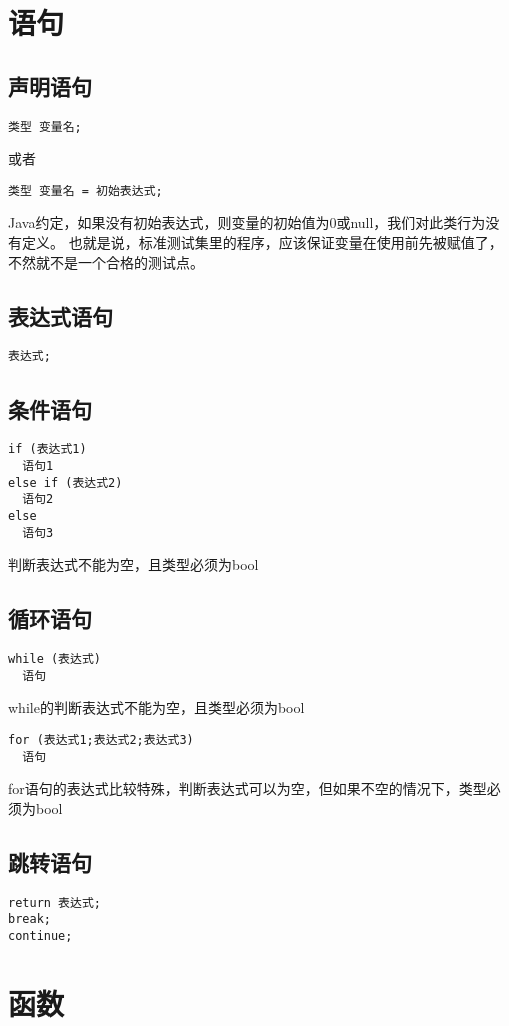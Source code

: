 \documentclass[twocolumn]{article}
\begin{document}
\section{语句}
\subsection{声明语句}
\begin{verbatim}
类型 变量名;
\end{verbatim}
或者
\begin{verbatim}
类型 变量名 = 初始表达式;
\end{verbatim}
Java约定，如果没有初始表达式，则变量的初始值为0或null，我们对此类行为没有定义。
也就是说，标准测试集里的程序，应该保证变量在使用前先被赋值了，不然就不是一个合格的测试点。
\subsection{表达式语句}
\begin{verbatim}
表达式;
\end{verbatim}
\subsection{条件语句}
\begin{verbatim}
if (表达式1) 
  语句1 
else if (表达式2) 
  语句2
else 
  语句3
\end{verbatim}
判断表达式不能为空，且类型必须为bool
\subsection{循环语句}
\begin{verbatim}
while (表达式) 
  语句
\end{verbatim}
while的判断表达式不能为空，且类型必须为bool
\begin{verbatim}
for (表达式1;表达式2;表达式3) 
  语句
\end{verbatim}
for语句的表达式比较特殊，判断表达式可以为空，但如果不空的情况下，类型必须为bool
\subsection{跳转语句}
\begin{verbatim}
return 表达式;
break;
continue;
\end{verbatim}

\section{函数}
\end{document}
